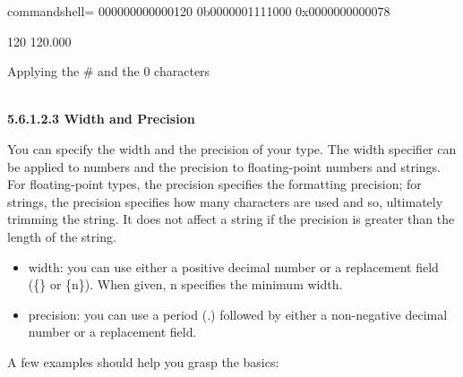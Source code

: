\begin{tcblisting}{commandshell={}}
000000000000120
0b0000001111000
0x0000000000078

120
120.000
\end{tcblisting}

\begin{center}
Applying the \# and the 0 characters
\end{center}

\hspace*{\fill} \\ %
\noindent
\textbf{5.6.1.2.3\hspace{0.2cm} Width and Precision}

You can specify the width and the precision of your type. The width specifier can be applied to numbers and the precision to floating-point numbers and strings. For floating-point types, the precision specifies the formatting precision; for strings, the precision specifies how many characters are used and so, ultimately trimming the string. It does not affect a string if the precision is greater than the length of the string.

\begin{itemize}
\item 
width: you can use either a positive decimal number or a replacement field (\{\} or \{n\}). When given, n specifies the minimum width.

\item 
precision: you can use a period (.) followed by either a non-negative decimal number or a replacement field.
\end{itemize}

A few examples should help you grasp the basics:


